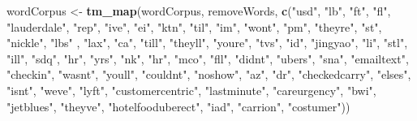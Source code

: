 \documentclass[
]{article}
\newenvironment{Shaded}{\begin{snugshade}}{\end{snugshade}}
\newcommand{\FunctionTok}[1]{\textcolor[rgb]{0.13,0.29,0.53}{\textbf{#1}}}
\newcommand{\NormalTok}[1]{#1}
\newcommand{\OtherTok}[1]{\textcolor[rgb]{0.56,0.35,0.01}{#1}}
\newcommand{\StringTok}[1]{\textcolor[rgb]{0.31,0.60,0.02}{#1}}
\begin{document}
\begin{Shaded}
\begin{Highlighting}[]
\NormalTok{wordCorpus }\OtherTok{\textless{}{-}} \FunctionTok{tm\_map}\NormalTok{(wordCorpus, removeWords, }\FunctionTok{c}\NormalTok{(}\StringTok{"usd"}\NormalTok{, }\StringTok{"lb"}\NormalTok{, }\StringTok{"ft"}\NormalTok{, }\StringTok{"fl"}\NormalTok{, }\StringTok{"lauderdale"}\NormalTok{, }\StringTok{"rep"}\NormalTok{, }\StringTok{"ive"}\NormalTok{, }\StringTok{"ei"}\NormalTok{, }\StringTok{"ktn"}\NormalTok{, }\StringTok{"til"}\NormalTok{, }\StringTok{"im"}\NormalTok{, }\StringTok{"wont"}\NormalTok{, }\StringTok{"pm"}\NormalTok{,}
                                                \StringTok{"theyre"}\NormalTok{, }\StringTok{"st"}\NormalTok{, }\StringTok{"nickle"}\NormalTok{, }\StringTok{"lbs"}\NormalTok{ , }\StringTok{"lax"}\NormalTok{, }\StringTok{"ca"}\NormalTok{, }\StringTok{"till"}\NormalTok{, }\StringTok{"theyll"}\NormalTok{, }\StringTok{"youre"}\NormalTok{, }\StringTok{"tvs"}\NormalTok{, }\StringTok{"id"}\NormalTok{, }\StringTok{"jingyao"}\NormalTok{, }\StringTok{"li"}\NormalTok{, }\StringTok{"stl"}\NormalTok{, }\StringTok{"ill"}\NormalTok{,}
                                                \StringTok{"sdq"}\NormalTok{, }\StringTok{"hr"}\NormalTok{, }\StringTok{"yrs"}\NormalTok{, }\StringTok{"nk"}\NormalTok{, }\StringTok{"hr"}\NormalTok{, }\StringTok{"mco"}\NormalTok{, }\StringTok{"fll"}\NormalTok{, }\StringTok{"didnt"}\NormalTok{, }\StringTok{"ubers"}\NormalTok{, }\StringTok{"sna"}\NormalTok{, }\StringTok{"emailtext"}\NormalTok{, }\StringTok{"checkin"}\NormalTok{,}
                                                \StringTok{"wasnt"}\NormalTok{, }\StringTok{"youll"}\NormalTok{, }\StringTok{"couldnt"}\NormalTok{, }\StringTok{"noshow"}\NormalTok{, }\StringTok{"az"}\NormalTok{, }\StringTok{"dr"}\NormalTok{, }\StringTok{"checkedcarry"}\NormalTok{, }\StringTok{"elses"}\NormalTok{, }\StringTok{"isnt"}\NormalTok{, }\StringTok{"weve"}\NormalTok{,}
                                                \StringTok{"lyft"}\NormalTok{, }\StringTok{"customercentric"}\NormalTok{, }\StringTok{"lastminute"}\NormalTok{, }\StringTok{"careurgency"}\NormalTok{, }\StringTok{"bwi"}\NormalTok{, }\StringTok{"jetblues"}\NormalTok{, }\StringTok{"theyve"}\NormalTok{, }\StringTok{"hotelfooduberect"}\NormalTok{,}
                                                \StringTok{"iad"}\NormalTok{, }\StringTok{"carrion"}\NormalTok{, }\StringTok{"costumer"}\NormalTok{))}
\end{Highlighting}
\end{Shaded}
\end{document}
